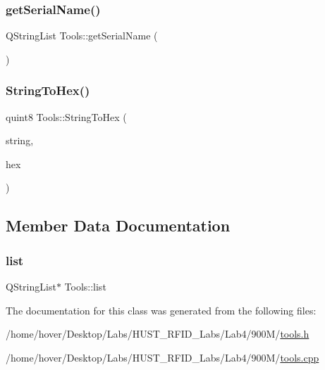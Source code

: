 \subsubsection{\texorpdfstring{getSerialName()}{getSerialName()}}
{\footnotesize\ttfamily Q\+String\+List Tools\+::get\+Serial\+Name (\begin{DoxyParamCaption}{ }\end{DoxyParamCaption})}

\mbox{\label{class_tools_a724c823ede8cd11880888f64b1a3c4df}} 
\subsubsection{\texorpdfstring{StringToHex()}{StringToHex()}}
{\footnotesize\ttfamily quint8 Tools\+::\+String\+To\+Hex (\begin{DoxyParamCaption}\item[{Q\+String}]{string,  }\item[{quint8 $\ast$}]{hex }\end{DoxyParamCaption})}



\subsection{Member Data Documentation}
\mbox{\label{class_tools_a2d01c59dccd50660c98f9ad7ee13f5d0}} 
\subsubsection{\texorpdfstring{list}{list}}
{\footnotesize\ttfamily Q\+String\+List$\ast$ Tools\+::list\hspace{0.3cm}{\ttfamily [private]}}



The documentation for this class was generated from the following files\+:\begin{DoxyCompactItemize}
\item 
/home/hover/\+Desktop/\+Labs/\+H\+U\+S\+T\+\_\+\+R\+F\+I\+D\+\_\+\+Labs/\+Lab4/900\+M/\mbox{\hyperlink{tools_8h}{tools.\+h}}\item 
/home/hover/\+Desktop/\+Labs/\+H\+U\+S\+T\+\_\+\+R\+F\+I\+D\+\_\+\+Labs/\+Lab4/900\+M/\mbox{\hyperlink{tools_8cpp}{tools.\+cpp}}\end{DoxyCompactItemize}
